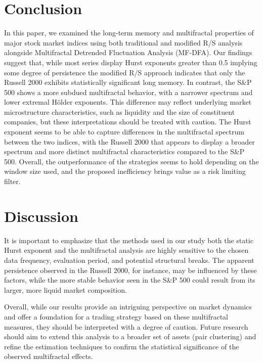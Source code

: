 \documentclass[11pt]{extarticle}
\begin{document}
\section{Conclusion}

In this paper, we examined the long-term memory and multifractal properties of major stock market indices using both
traditional and modified R/S analysis alongside Multifractal Detrended Fluctuation Analysis (MF-DFA). Our findings
suggest that, while most series display Hurst exponents greater than 0.5 implying some degree of persistence the
modified R/S approach indicates that only the Russell 2000 exhibits statistically significant long memory.
In contrast, the S\&P 500 shows a more subdued multifractal behavior, with a narrower spectrum and lower extremal Hölder
exponents. This difference may reflect underlying market microstructure characteristics, such as liquidity and the size
of constituent companies, but these interpretations should be treated with caution. The Hurst exponent seems to be able
to capture differences in the multifractal spectrum between the two indices, with the Russell 2000 that appears to
display a broader spectrum and more distinct multifractal characteristics compared to the S\&P 500. Overall, the outperformance
of the strategies seems to hold depending on the window size used, and the proposed inefficiency brings value as a risk
limiting filter.

\section{Discussion}

It is important to emphasize that the methods used in our study both the static Hurst exponent and the multifractal
analysis are highly sensitive to the chosen data frequency, evaluation period, and potential structural breaks. The
apparent persistence observed in the Russell 2000, for instance, may be influenced by these factors, while the more
stable behavior seen in the S\&P 500 could result from its larger, more liquid market composition.

Overall, while our results provide an intriguing perspective on market dynamics and offer a foundation for a trading
strategy based on these multifractal measures, they should be interpreted with a degree of caution. Future research
should aim to extend this analysis to a broader set of assets (pair clustering) and refine the estimation techniques
to confirm the statistical significance of the observed multifractal effects.
\end{document}
